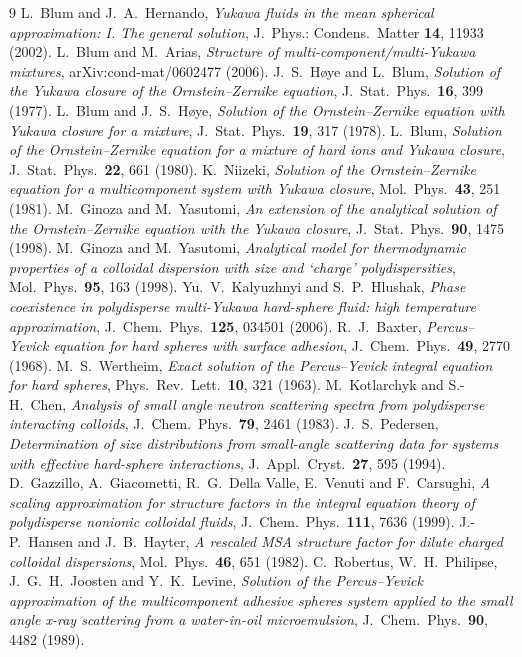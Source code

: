 \documentclass[11pt,a4paper]{article}
\begin{document}
\begin{thebibliography}{9}
 L.~Blum and J.~A.~Hernando,
  \emph{Yukawa fluids in the mean spherical approximation: I. The general
  solution}, J.~Phys.: Condens.\ Matter \textbf{14}, 11933 (2002).
 L.~Blum and M.~Arias,
  \emph{Structure of multi-component/multi-Yukawa mixtures},
  arXiv:cond-mat/0602477 (2006).
 J.~S.~Høye and L.~Blum,
  \emph{Solution of the Yukawa closure of the Ornstein--Zernike equation},
  J.~Stat.\ Phys.\ \textbf{16}, 399 (1977).
 L.~Blum and J.~S.~Høye,
  \emph{Solution of the Ornstein--Zernike equation with Yukawa closure for a
  mixture}, J.~Stat.\ Phys.\ \textbf{19}, 317 (1978).
 L.~Blum,
  \emph{Solution of the Ornstein--Zernike equation for a mixture of hard ions
  and Yukawa closure}, J.~Stat.\ Phys.\ \textbf{22}, 661 (1980).
 K.~Niizeki,
  \emph{Solution of the Ornstein--Zernike equation for a multicomponent system
  with Yukawa closure}, Mol.\ Phys.\ \textbf{43}, 251 (1981).
 M.~Ginoza and M.~Yasutomi,
  \emph{An extension of the analytical solution of the Ornstein--Zernike
  equation with the Yukawa closure},
  J.~Stat.\ Phys.\ \textbf{90}, 1475 (1998).
 M.~Ginoza and M.~Yasutomi,
  \emph{Analytical model for thermodynamic properties of a colloidal dispersion
  with size and `charge' polydispersities},
  Mol.\ Phys.\ \textbf{95}, 163 (1998).
 Yu.~V.~Kalyuzhnyi and S.~P.~Hlushak,
  \emph{Phase coexistence in polydisperse multi-Yukawa hard-sphere fluid: high
  temperature approximation}, J.~Chem.\ Phys.\ \textbf{125}, 034501 (2006).
 R.~J.~Baxter,
  \emph{Percus--Yevick equation for hard spheres with surface adhesion},
  J.~Chem.\ Phys.\ \textbf{49}, 2770 (1968).
 M.~S.~Wertheim,
  \emph{Exact solution of the Percus--Yevick integral equation for hard
  spheres}, Phys.\ Rev.\ Lett.\ \textbf{10}, 321 (1963).
 M.~Kotlarchyk and S.-H.~Chen,
  \emph{Analysis of small angle neutron scattering spectra from polydisperse
  interacting colloids}, J.~Chem.\ Phys.\ \textbf{79}, 2461 (1983).
 J.~S.~Pedersen,
  \emph{Determination of size distributions from small-angle scattering data
  for systems with effective hard-sphere interactions},
  J.~Appl.\ Cryst.\ \textbf{27}, 595 (1994).
 D.~Gazzillo, A.~Giacometti, R.~G.~Della Valle,
  E.~Venuti and F.~Carsughi,
  \emph{A scaling approximation for structure factors in the integral equation
  theory of polydisperse nonionic colloidal fluids},
  J.~Chem.\ Phys.\ \textbf{111}, 7636 (1999).
 J.-P.~Hansen and J.~B.~Hayter,
  \emph{A rescaled MSA structure factor for dilute charged colloidal
  dispersions}, Mol.\ Phys.\ \textbf{46}, 651 (1982).
 C.~Robertus, W.~H.~Philipse, J.~G.~H.~Joosten and
  Y.~K.~Levine, \emph{Solution of the Percus--Yevick approximation of the
  multicomponent adhesive spheres system applied to the small angle x-ray
  scattering from a water-in-oil microemulsion},
  J.~Chem.\ Phys.\ \textbf{90}, 4482 (1989).
\end{thebibliography}
\end{document}

